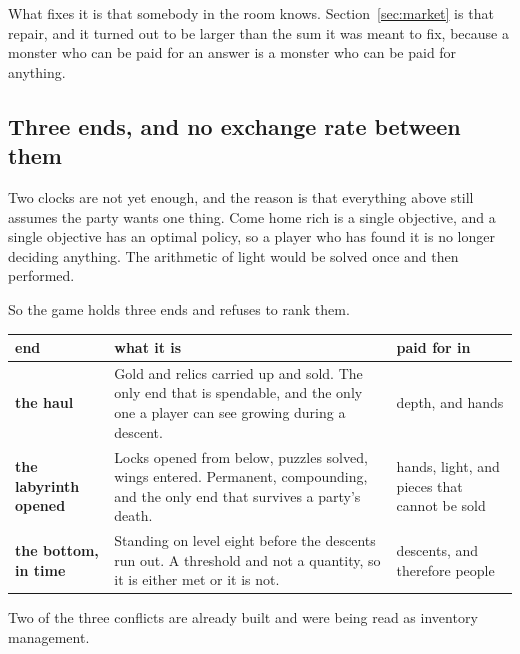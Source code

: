 \documentclass[11pt,a4paper]{article}
\begin{document}
\begin{sectionbox}
What fixes it is that somebody in the room knows. Section~\ref{sec:market} is that repair, and it
turned out to be larger than the sum it was meant to fix, because a monster who can be paid for an
answer is a monster who can be paid for anything.
\end{sectionbox}

\subsection{Three ends, and no exchange rate between them}
\label{sec:ends}

Two clocks are not yet enough, and the reason is that everything above still assumes the party
wants one thing. Come home rich is a single objective, and a single objective has an optimal
policy, so a player who has found it is no longer deciding anything. The arithmetic of light would
be solved once and then performed.

So the game holds three ends and refuses to rank them.

\begin{center}
\begin{tabular}{@{}>{\raggedright\arraybackslash}p{}@{\hspace{4mm}}>{\raggedright\arraybackslash}p{}@{\hspace{4mm}}>{\raggedright\arraybackslash}p{}@{}}
\toprule
\textbf{end} & \textbf{what it is} & \textbf{paid for in} \\
\midrule
\textbf{the haul} & Gold and relics carried up and sold. The only end that is spendable, and the
only one a player can see growing during a descent. &
depth, and hands \\[1mm]
\textbf{the labyrinth opened} & Locks opened from below, puzzles solved, wings entered. Permanent,
compounding, and the only end that survives a party's death. &
hands, light, and pieces that cannot be sold \\[1mm]
\textbf{the bottom, in time} & Standing on level eight before the descents run out. A threshold
and not a quantity, so it is either met or it is not. &
descents, and therefore people \\
\bottomrule
\end{tabular}
\end{center}

Two of the three conflicts are already built and were being read as inventory management.
\end{document}
